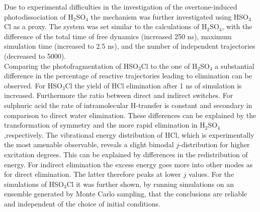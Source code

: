 \documentclass[journal=jacsat,manuscript=article]{achemso}
\begin{document}
\noindent
Due to experimental difficulties in the investigation of the overtone-induced photodissociation of H$_2$SO$_4$ the mechanism was further investigated using HSO$_3$Cl as a proxy\cite{reyesbrickel.pccp.2016.msarmd}. The system was set similar to the calculations of H$_2$SO$_4$, with the difference of the total time of free dynamics (increased 250 ns), maximum simulation time (increased to 2.5 ns), and the number of independent trajectories (decreased to 5000).\\
\noindent Comparing the photofragmentation of HSO$_3$Cl to the one of H$_2$SO$_4$ a substantial difference in the percentage of reactive trajectories leading to elimination can be observed. For HSO$_3$Cl the yield of HCl elimination after 1 ns of simulation is increased. Furthermore the ratio between direct and indirect switches. For sulphuric acid the rate of intramolecular H-transfer is constant and secondary in comparison to direct water elimination. These differences can be explained by the transformation of symmetry and the more rapid elimination in H$_2$SO$_4$ ,respectively. The vibrational energy distribution of HCl, which is experimentally the most amenable observable, reveals a slight bimodal $j$-distribution for higher excitation degrees. This can be explained by differences in the redistribution of energy. For indirect elimination the excess energy goes more into other modes as for direct elimination. The latter therefore peaks at lower $j$ values. For the simulations of HSO$_3$Cl it was further shown, by running simulations on an ensemble generated by Monte Carlo sampling, that the conclusions are reliable and independent of the choice of initial conditions.
 
\end{document}
